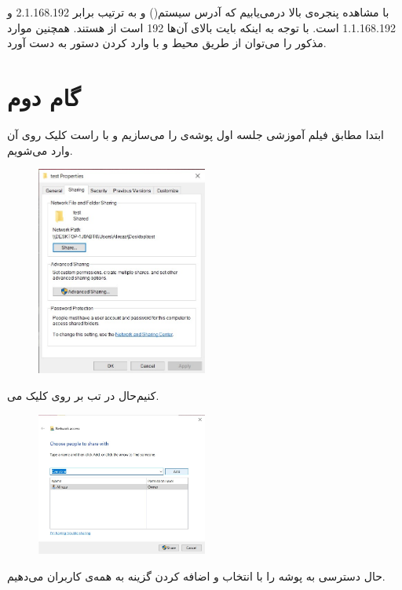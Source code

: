 \documentclass{article}
\begin{document}
با مشاهده پنجره‌ی بالا درمی‌یابیم که آدرس سیستم() و  به ترتیب برابر 2.1.168.192 و 1.1.168.192 است. با توجه به اینکه بایت بالای آن‌ها 192 است از  هستند. همچنین موارد مذکور را می‌توان از طریق محیط  و با وارد کردن دستور  به دست آورد.

\section{گام دوم}
 ابتدا مطابق فیلم آموزشی جلسه اول پوشه‌ی  را می‌سازیم و با راست کلیک روی آن وارد  می‌شویم.
\begin{figure}[H]
    \centering
    \includegraphics[width=0.5\textwidth]{figures/2.1.jpg}
    \caption
	{
	}
    \label{fig:fig1}
\end{figure}
حال در تب  بر روی  کلیک می‎‌کنیم.
\begin{figure}[H]
    \centering
    \includegraphics[width=0.5\textwidth]{figures/2.2.jpg}
    \caption
	{
	}
    \label{fig:fig1}
\end{figure}
حال دسترسی به پوشه را با انتخاب و اضافه کردن گزینه  به همه‌ی کاربران می‌دهیم.
\end{document}
